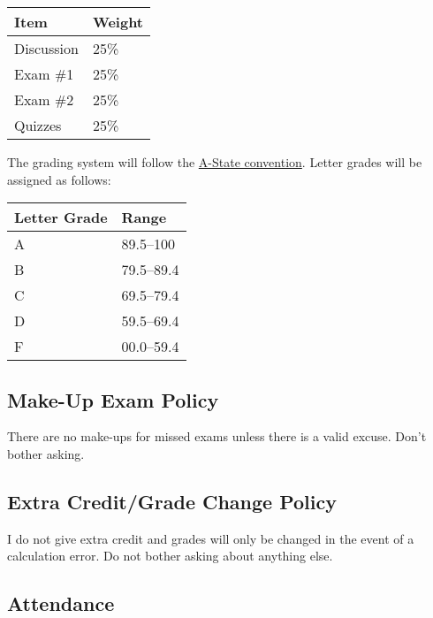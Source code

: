 \documentclass[11pt]{article}
\begin{document}
\vspace{1cm}

\begin{center}
\begin{tabular}{@{}p{5cm} p{5cm}@{}}
  \textbf{Item} & \textbf{Weight} \\
  \hline
  Discussion & 25\% \\
  Exam \#1 & 25\% \\
  Exam \#2 & 25\% \\
  Quizzes & 25\% \\
\end{tabular}
\end{center}

\vspace{1cm}

The grading system will follow the \href{https://www.astate.edu/college/graduate-school/academic-policies/}{A-State convention}. Letter grades will be assigned as follows:
\clearpage

\vspace{1cm}

\begin{center}
\begin{tabular}{@{}p{5cm} p{5cm}@{}}
  \textbf{Letter Grade} & \textbf{Range} \\
  \hline
  A & 89.5--100 \\
  B & 79.5--89.4 \\
  C & 69.5--79.4 \\
  D & 59.5--69.4 \\
  F & 00.0--59.4 \\
\end{tabular}
\end{center}

\subsection*{\textcolor{customred}{\bfseries Make-Up Exam Policy}}
There are no make-ups for missed exams unless there is a valid excuse. Don't bother asking.

\subsection*{\textcolor{customred}{\bfseries Extra Credit/Grade Change Policy}}
I do not give extra credit and grades will only be changed in the event of a calculation error. Do not bother asking about anything else.

\subsection*{\textcolor{customred}{\bfseries Attendance}}
\end{document}
